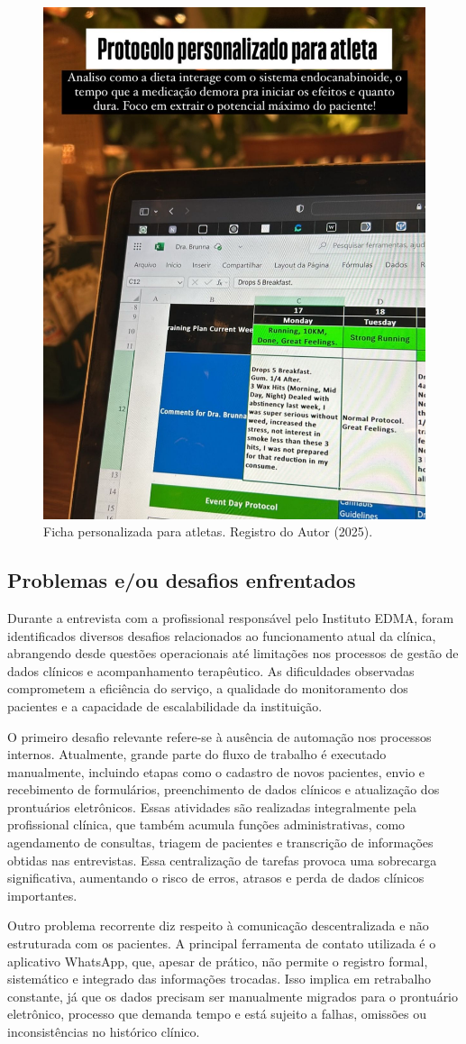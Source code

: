 \href{}{}\documentclass[12pt,portuguese,oneside]{article}
\begin{document}
\begin{figure}[H]
    \centering
    \includegraphics[width=0.4\linewidth]{imagens/atleta.jpeg}
    \caption{Ficha personalizada para atletas. Registro do Autor (2025).}
    \label{fig:atleta.png}
\end{figure}


\subsection{Problemas e/ou desafios enfrentados}
\hspace{1em}Durante a entrevista com a profissional responsável pelo Instituto EDMA, foram identificados diversos desafios relacionados ao funcionamento atual da clínica, abrangendo desde questões operacionais até limitações nos processos de gestão de dados clínicos e acompanhamento terapêutico. As dificuldades observadas comprometem a eficiência do serviço, a qualidade do monitoramento dos pacientes e a capacidade de escalabilidade da instituição.

O primeiro desafio relevante refere-se à ausência de automação nos processos internos. Atualmente, grande parte do fluxo de trabalho é executado manualmente, incluindo etapas como o cadastro de novos pacientes, envio e recebimento de formulários, preenchimento de dados clínicos e atualização dos prontuários eletrônicos. Essas atividades são realizadas integralmente pela profissional clínica, que também acumula funções administrativas, como agendamento de consultas, triagem de pacientes e transcrição de informações obtidas nas entrevistas. Essa centralização de tarefas provoca uma sobrecarga significativa, aumentando o risco de erros, atrasos e perda de dados clínicos importantes.

Outro problema recorrente diz respeito à comunicação descentralizada e não estruturada com os pacientes. A principal ferramenta de contato utilizada é o aplicativo WhatsApp, que, apesar de prático, não permite o registro formal, sistemático e integrado das informações trocadas. Isso implica em retrabalho constante, já que os dados precisam ser manualmente migrados para o prontuário eletrônico, processo que demanda tempo e está sujeito a falhas, omissões ou inconsistências no histórico clínico.
\end{document}
